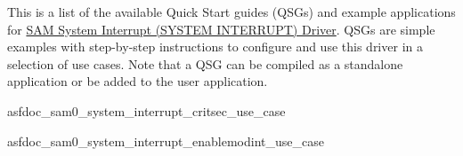 This is a list of the available Quick Start guides (Q\+S\+Gs) and example applications for \hyperlink{group__asfdoc__sam0__system__interrupt__group}{S\+A\+M System Interrupt (S\+Y\+S\+T\+E\+M I\+N\+T\+E\+R\+R\+U\+P\+T) Driver}. Q\+S\+Gs are simple examples with step-\/by-\/step instructions to configure and use this driver in a selection of use cases. Note that a Q\+S\+G can be compiled as a standalone application or be added to the user application.


\begin{DoxyItemize}
\item asfdoc\+\_\+sam0\+\_\+system\+\_\+interrupt\+\_\+critsec\+\_\+use\+\_\+case
\item asfdoc\+\_\+sam0\+\_\+system\+\_\+interrupt\+\_\+enablemodint\+\_\+use\+\_\+case 
\end{DoxyItemize}